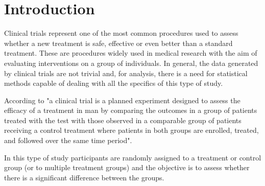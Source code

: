 \documentclass[AMA,STIX1COL]{WileyNJD-v2}
\begin{document}


\maketitle



\section{Introduction}\label{sec1}


Clinical trials represent one of the most common procedures used to assess whether a new treatment is safe, effective or even better than a standard treatment. These are procedures widely used in medical research with the aim of evaluating interventions on a group of individuals. In general, the data generated by clinical trials are not trivial and, for analysis, there is a need for statistical methods capable of dealing with all the specifics of this type of study.

According to \cite{meinert1986clinical} "a clinical trial is a planned experiment designed to assess the efficacy of a treatment in man by comparing the outcomes in a group of patients treated with the test with those observed in a comparable group of patients receiving a control treatment where patients in both groups are enrolled, treated, and followed over the same time period".

In this type of study participants are randomly assigned to a treatment or control group (or to multiple treatment groups) \cite{hannan2008randomized} and the objective is to assess whether there is a significant difference between the groups.
\end{document}

